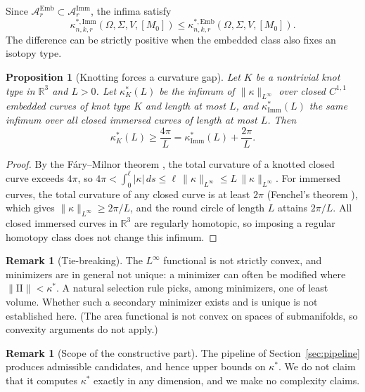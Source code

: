 \documentclass[11pt,reqno]{amsart}
\newtheorem{proposition}[theorem]{Proposition}
\theoremstyle{definition}
\newtheorem{remark}[theorem]{Remark}
\providecommand{\R}{\mathbb{R}}
\providecommand{\II}{\mathrm{I\!I}}
\numberwithin{equation}{section}
\providecommand{\II}{\mathrm{II}}
\providecommand{\R}{\mathbb{R}}
\begin{document}
Since $\mathcal{A}_r^{\mathrm{Emb}} \subset \mathcal{A}_r^{\mathrm{Imm}}$, the infima satisfy
\begin{equation}
\label{eq:embedding_immersion_gap}
\kappa^{*,\mathrm{Imm}}_{n,k,r}(\Omega, \Sigma, V, [M_0]) \le \kappa^{*,\mathrm{Emb}}_{n,k,r}(\Omega, \Sigma, V, [M_0]).
\end{equation}
The difference can be strictly positive when the embedded class also fixes an isotopy type.

\begin{proposition}[Knotting forces a curvature gap]
\label{prop:knot_gap}
Let $K$ be a nontrivial knot type in $\R^3$ and $L > 0$. Let $\kappa^*_K(L)$ be the infimum of $\|\kappa\|_{L^\infty}$ over closed $C^{1,1}$ embedded curves of knot type $K$ and length at most $L$, and $\kappa^*_{\mathrm{Imm}}(L)$ the same infimum over all closed immersed curves of length at most $L$. Then
\begin{equation}
\kappa^*_K(L) \ge \frac{4\pi}{L} = \kappa^*_{\mathrm{Imm}}(L) + \frac{2\pi}{L}.
\end{equation}
\end{proposition}

\begin{proof}
By the F\'ary--Milnor theorem \cite{fary1949, milnor1950}, the total curvature of a knotted closed curve exceeds $4\pi$, so $4\pi < \int_0^\ell |\kappa|\,ds \le \ell\,\|\kappa\|_{L^\infty} \le L\,\|\kappa\|_{L^\infty}$. For immersed curves, the total curvature of any closed curve is at least $2\pi$ (Fenchel's theorem \cite{fenchel1929}), which gives $\|\kappa\|_{L^\infty} \ge 2\pi/L$, and the round circle of length $L$ attains $2\pi/L$. All closed immersed curves in $\R^3$ are regularly homotopic, so imposing a regular homotopy class does not change this infimum.
\end{proof}

\begin{remark}[Tie-breaking]
The $L^\infty$ functional is not strictly convex, and minimizers are in general not unique: a minimizer can often be modified where $\|\II\| < \kappa^*$. A natural selection rule picks, among minimizers, one of least volume. Whether such a secondary minimizer exists and is unique is not established here. (The area functional is not convex on spaces of submanifolds, so convexity arguments do not apply.)
\end{remark}

\begin{remark}[Scope of the constructive part]
The pipeline of Section~\ref{sec:pipeline} produces admissible candidates, and hence upper bounds on $\kappa^*$. We do not claim that it computes $\kappa^*$ exactly in any dimension, and we make no complexity claims.
\end{remark}
\end{document}
